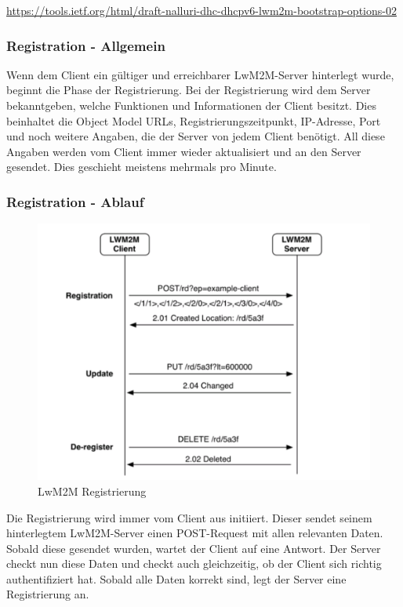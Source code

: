 \href{https://tools.ietf.org/html/draft-nalluri-dhc-dhcpv6-lwm2m-bootstrap-options-02}{https://tools.ietf.org/html/draft-nalluri-dhc-dhcpv6-lwm2m-bootstrap-options-02}

\subsubsection{Registration - Allgemein}
Wenn dem Client ein gültiger und erreichbarer LwM2M-Server hinterlegt wurde, beginnt die Phase der Registrierung. Bei der Registrierung wird dem Server bekanntgeben, welche Funktionen und Informationen der Client besitzt. Dies beinhaltet die Object Model URLs, Registrierungszeitpunkt, IP-Adresse, Port und noch weitere Angaben, die der Server von jedem Client benötigt. All diese Angaben werden vom Client immer wieder aktualisiert und an den Server gesendet. Dies geschieht meistens mehrmals pro Minute.
\newpage
\subsubsection{Registration - Ablauf}
\begin{figure}[H]
\includegraphics[scale=0.4]{../02_Analyse/images/lwm2m/registration_diagram.png}
\caption{LwM2M Registrierung\cite{LwM2MInterfaces}}
\end{figure}
Die Registrierung wird immer vom Client aus initiiert. Dieser sendet seinem hinterlegtem LwM2M-Server einen POST-Request mit allen relevanten Daten. Sobald diese gesendet wurden, wartet der Client auf eine Antwort. Der Server checkt nun diese Daten und checkt auch gleichzeitig, ob der Client sich richtig authentifiziert hat. Sobald alle Daten korrekt sind, legt der Server eine Registrierung an.

